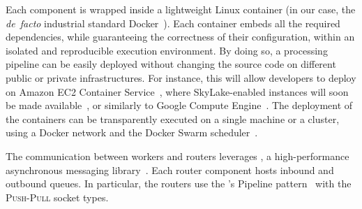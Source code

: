 

Each component is wrapped inside a lightweight Linux container (in our case, the \emph{de~facto} industrial standard Docker~\cite{docker}).
Each container embeds all the required dependencies, while guaranteeing the correctness of their configuration, within an isolated and reproducible execution environment.
By doing so, a \SYS{} processing pipeline can be easily deployed without changing the source code on different public or private infrastructures.
For instance, this will allow developers to deploy \SYS{} on Amazon EC2 Container Service~\cite{awsec2container}, where SkyLake-enabled instances will soon be made available~\cite{amazonskylake}, or similarly to Google Compute Engine~\cite{gceskylake}.
The deployment of the containers can be transparently executed on a single machine or a cluster, using a Docker network and the Docker Swarm scheduler~\cite{docker:swarm_2016}.

The communication between workers and routers leverages \zmq{}, a high-performance asynchronous messaging library~\cite{zero_mq}.
Each router component hosts inbound and outbound queues.
In particular, the routers use the \zmq's Pipeline pattern~\cite{zero_mq:pipeline} with the \textsc{Push}-\textsc{Pull} socket types. 

